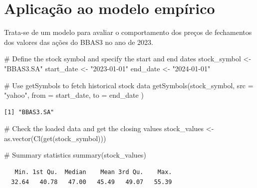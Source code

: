 \documentclass[
  letterpaper,
  DIV=11,
  numbers=noendperiod]{scrreprt}
\newenvironment{Shaded}{\begin{snugshade}}{\end{snugshade}}
\newcommand{\AttributeTok}[1]{\textcolor[rgb]{0.40,0.45,0.13}{#1}}
\newcommand{\CommentTok}[1]{\textcolor[rgb]{0.37,0.37,0.37}{#1}}
\newcommand{\FunctionTok}[1]{\textcolor[rgb]{0.28,0.35,0.67}{#1}}
\newcommand{\NormalTok}[1]{\textcolor[rgb]{0.00,0.23,0.31}{#1}}
\newcommand{\OtherTok}[1]{\textcolor[rgb]{0.00,0.23,0.31}{#1}}
\newcommand{\StringTok}[1]{\textcolor[rgb]{0.13,0.47,0.30}{#1}}
\begin{document}

\hypertarget{aplicauxe7uxe3o-ao-modelo-empuxedrico-1}{%
\section*{Aplicação ao modelo
empírico}\label{aplicauxe7uxe3o-ao-modelo-empuxedrico-1}}


Trata-se de um modelo para avaliar o comportamento dos preços de
fechamentos dos valores das ações do BBAS3 no ano de 2023.

\begin{Shaded}
\begin{Highlighting}[]
\CommentTok{\# Define the stock symbol and specify the start and end dates}
\NormalTok{stock\_symbol }\OtherTok{\textless{}{-}} \StringTok{"BBAS3.SA"}
\NormalTok{start\_date }\OtherTok{\textless{}{-}} \StringTok{"2023{-}01{-}01"}
\NormalTok{end\_date }\OtherTok{\textless{}{-}} \StringTok{"2024{-}01{-}01"}

\CommentTok{\# Use getSymbols to fetch historical stock data}
\FunctionTok{getSymbols}\NormalTok{(stock\_symbol,}
    \AttributeTok{src =} \StringTok{"yahoo"}\NormalTok{,}
    \AttributeTok{from =}\NormalTok{ start\_date,}
    \AttributeTok{to =}\NormalTok{ end\_date}
\NormalTok{)}
\end{Highlighting}
\end{Shaded}

\begin{verbatim}
[1] "BBAS3.SA"
\end{verbatim}

\begin{Shaded}
\begin{Highlighting}[]
\CommentTok{\# Check the loaded data and get the closing values}
\NormalTok{stock\_values }\OtherTok{\textless{}{-}} \FunctionTok{as.vector}\NormalTok{(}\FunctionTok{Cl}\NormalTok{(}\FunctionTok{get}\NormalTok{(stock\_symbol)))}

\CommentTok{\# Summary statistics}
\FunctionTok{summary}\NormalTok{(stock\_values)}
\end{Highlighting}
\end{Shaded}

\begin{verbatim}
   Min. 1st Qu.  Median    Mean 3rd Qu.    Max. 
  32.64   40.78   47.00   45.49   49.07   55.39 
\end{verbatim}
\end{document}
